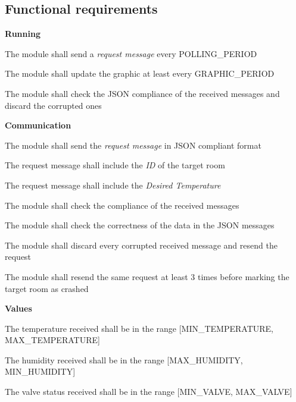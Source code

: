 \subsection{Functional requirements}
\begin{req_enum}
	\item \textbf{Running}
	\begin{req_enum}[label*=\arabic*.]
		\item The module shall send a \textit{request message} every POLLING\_PERIOD
		\item The module shall update the graphic at least every GRAPHIC\_PERIOD
		\item The module shall check the JSON compliance of the received messages and discard the corrupted ones
	\end{req_enum}

	\item \textbf{Communication}
	\begin{req_enum}[label*=\arabic*.]
		\item The module shall send the \textit{request message} in JSON compliant format
		\begin{req_enum}[label*=\arabic*.]
			\item The request message shall include the \textit{ID} of the target room
			\item The request message shall include the \textit{Desired Temperature}
		\end{req_enum}
		\item The module shall check the compliance of the received messages
		\item The module shall check the correctness of the data in the JSON messages
		\item The module shall discard every corrupted received message and resend the request
		\item The module shall resend the same request at least 3 times before marking the target room as crashed
	\end{req_enum}

	\item \textbf{Values}
	\begin{req_enum}[label*=\arabic*.]
		\item The temperature received shall be in the range [MIN\_TEMPERATURE, MAX\_TEMPERATURE]
		\item The humidity received shall be in the range [MAX\_HUMIDITY, MIN\_HUMIDITY]
		\item The valve status received shall be in the range [MIN\_VALVE, MAX\_VALVE]
	\end{req_enum}

\end{req_enum}
